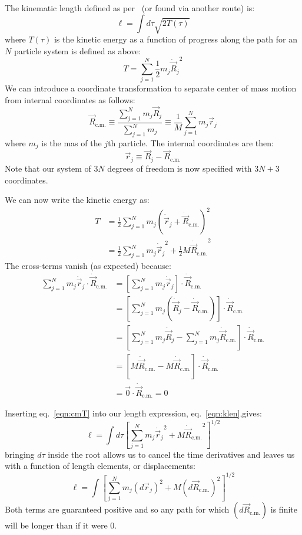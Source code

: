 \documentclass[letter,11pt]{article}
\newcommand{\svec}[1]{\vec{#1}}
\newcommand{\laeq}[1]{\label{eqn:#1}}
\newcommand{\refeq}[1]{eq.~\ref{eqn:#1}}
\newcommand{\Rcm}{\svec{R}_{\textrm{c.m.}}}
\newcommand{\dotRcm}{\dot{\svec{R}}_{\textrm{c.m.}}}
\begin{document}
The kinematic length defined as per~\cite{wang:2007:geodesics} (or found via another route) is:
\begin{equation}\label{eqn:klen}
\ell = \int d\tau\sqrt{2 T(\tau)}
\end{equation}
where $T(\tau)$ is the kinetic energy as a function of progress along the path for an $N$ particle system is defined as above:
\begin{equation}
  T = \sum_{j=1}^{N} \frac{1}{2} m_j {\dot{\svec{R}}_j}^2
\end{equation}
We can introduce a coordinate transformation to separate center of mass motion from internal coordinates as follows:
\begin{equation}\laeq{Rcm}
  \Rcm \equiv \frac{\sum^{N}_{j=1}m_j \svec{R}_j}{\sum^{N}_{j=1}m_j} \equiv \frac{1}{M} \sum^{N}_{j=1}m_j \svec{r}_j
\end{equation}
where $m_j$ is the mas of the $j$th particle. The internal coordinates are then:
\begin{equation}\laeq{internalCoors}
  \svec{r}_j \equiv \svec{R}_j - \Rcm
\end{equation}
Note that our system of $3N$ degrees of freedom is now specified with $3N + 3$ coordinates.

We can now write the kinetic energy as:
\begin{align}
  T &= \frac{1}{2}\sum_{j=1}^{N} m_{j} {\left(\dot{\svec{r}}_{j} + \dotRcm \right)}^2 \\
    &= \frac{1}{2}\sum_{j=1}^{N} m_{j} {\dot{\svec{r}}_{j}}^2 + \frac{1}{2}M {\dotRcm}^{2} \laeq{cmT}
\end{align}
The cross-terms vanish (as expected) because:
\begin{align}
  \sum_{j=1}^{N} m_{j} \dot{\svec{r}}_j \cdot \dotRcm &= \left[ \sum_{j=1}^{N} m_{j} \dot{\svec{r}}_j \right] \cdot \dotRcm \\
  &= \left[\sum_{j=1}^N m_j \left( \dot{\svec{R}}_j - \dotRcm \right) \right] \cdot \dotRcm\\
  &= \left[\sum_{j=1}^N m_j \dot{\svec{R}}_j - \sum_{j=1}^N m_j \dotRcm \right] \cdot \dotRcm \\
  &= \left[ M\dotRcm - M\dotRcm \right] \cdot \dotRcm \\
  &= \svec{0} \cdot \dotRcm = 0
\end{align}

Inserting \refeq{cmT} into our length expression, \refeq{klen},gives:
\begin{equation}
  \ell = \int d\tau {\left[ \sum_{j=1}^{N} m_{j} {\dot{\svec{r}}_{j}}^2 + M {\dotRcm}^{2} \right]}^{1/2}
\end{equation}
bringing $d\tau$ inside the root allows us to cancel the time derivatives and leaves us with a function of length elements, or displacements:
\begin{equation}
  \ell = \int {\left[ \sum_{j=1}^{N} m_{j} {\left(d{\svec{r}}_{j} \right)}^2 + M {\left( d\Rcm \right)}^{2} \right]}^{1/2}
\end{equation}
Both terms are guaranteed positive and so any path for which $\left( d\Rcm \right)$ is finite will be longer than if it were 0.
\end{document}
